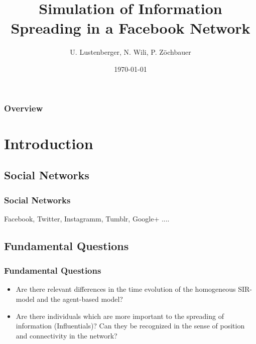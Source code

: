 \documentclass{beamer}
\title[Infospreading]{Simulation of Information Spreading in a Facebook Network} %
\author{U. Lustenberger, N. Wili, P. Z\"ochbauer} %
\institute[ETHZ] %
{
Federal Institute of Technology Zurich \\ %
\medskip
\textit{} %
}
\date{\today} %
\begin{document}
\begin{frame}
\titlepage %
\end{frame}

\begin{frame}
\frametitle{Overview} %
\tableofcontents %
\end{frame}


\section{Introduction} %

\subsection{Social Networks} %

\begin{frame}
\frametitle{Social Networks}
Facebook, Twitter, Instagramm, Tumblr, Google+ ....

\end{frame}


\subsection{Fundamental Questions}

\begin{frame}
\frametitle{Fundamental Questions}
\begin{itemize}

\item Are there relevant differences in the time evolution of the homogeneous SIR-model and the agent-based model?
\vspace{1cm}
\item Are there individuals which are more important to the spreading of information (Influentials)? Can they be recognized in the sense of position and connectivity in the network?


\end{itemize}
\end{frame}
\end{document}
